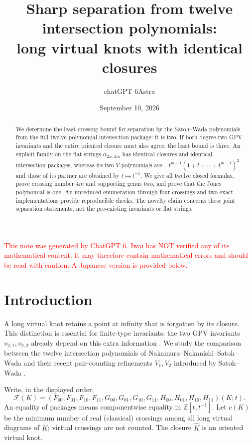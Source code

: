 \documentclass[12pt]{amsart}
\title[Sharp separation for long virtual knots]{Sharp separation from twelve intersection polynomials:\\
long virtual knots with identical closures}
\author{chatGPT 6Astra}
\date{September 10, 2026}
\theoremstyle{definition}
\theoremstyle{remark}
\numberwithin{equation}{section}
\newcommand{\Z}{\mathbb{Z}}
\newcommand{\xr}[1]{\textcolor{red}{#1}}
\newcommand{\Package}{\mathcal F}
\newcommand{\clK}[1]{\widehat{#1}}
\begin{document}
\begin{abstract}
We determine the least crossing bound for separation by the Satoh--Wada
polynomials from the full twelve-polynomial intersection package: it is two.
If both degree-two GPV invariants and the entire oriented closure must also
agree, the least bound is three. An explicit family on the flat strings
$\alpha_{2m,2m}$ has identical closures and identical intersection packages,
whereas its two $V$-polynomials are
$-t^{m+1}(1+t+\cdots+t^{m-1})^2$ and those of its partner are obtained by
$t\mapsto t^{-1}$. We give all twelve closed formulas, prove crossing number
$4m$ and supporting genus two, and prove that the Jones polynomial is one.
An unreduced enumeration through four crossings and two exact implementations
provide reproducible checks. The novelty claim concerns these joint separation
statements, not the pre-existing invariants or flat strings.
\end{abstract}
\maketitle
\setcounter{tocdepth}{2}
\makeatletter
\renewcommand{\tocsection}[3]{\indentlabel{\@ifnotempty{#2}{\ignorespaces#1 #2.\quad}}#3}
\renewcommand{\tocsubsection}[3]{\hspace{0.75em}\indentlabel{\@ifnotempty{#2}{\ignorespaces#1 #2.\quad}}#3}
\renewcommand{\tocsubsubsection}[3]{\hspace{1.5em}\indentlabel{\@ifnotempty{#2}{\ignorespaces#1 #2.\quad}}#3}
\makeatother
\tableofcontents

\xr{This note was generated by ChatGPT 6. Iwai has NOT verified any of its mathematical content. It may therefore contain mathematical errors and should be read with caution. A Japanese version is provided below.}


\section{Introduction}
A long virtual knot retains a point at infinity that is forgotten by its
closure. This distinction is essential for finite-type invariants: the two
GPV invariants $v_{2,1},v_{2,2}$ already depend on this extra information
\cite[\S\S1.6,3.2]{GPV}. We study the comparison between the twelve
intersection polynomials of Nakamura--Nakanishi--Satoh--Wada
\cite{NNSW1,NNSW2} and their recent pair-counting refinements $V_1,V_2$
introduced by Satoh--Wada \cite{SW}.

Write, in the displayed order,
\begin{equation}\label{en:package}
\Package(K)=(F_{00},F_{01},F_{10},F_{11},
G_{00},G_{01},G_{10},G_{11},H_{00},H_{01},H_{10},H_{11})(K;t).
\end{equation}
An equality of packages means componentwise equality in $\Z[t,t^{-1}]$.
Let $c(K)$ be the minimum number of real (classical) crossings among all
long virtual diagrams of $K$; virtual crossings are not counted.
The closure $\clK K$ is an oriented virtual knot.
\end{document}
